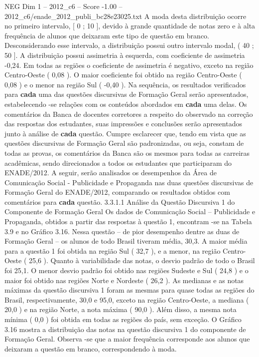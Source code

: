 \begin{textsample}{NEG Dim 1 – 2012\_c6 – Score -1.00 – 2012\_c6/enade\_2012\_publi\_bc28e23025.txt}
A moda desta distribuição ocorre no primeiro intervalo, [ 0 ; 10 ], devido à grande quantidade de notas zero e à alta frequência de alunos que deixaram este tipo de questão em branco.
Desconsiderando esse intervalo, a distribuição possui outro intervalo modal, ( 40 ; 50 ].
A distribuição possui assimetria à esquerda, com coeficiente de assimetria -0,24.
Em todas as regiões o coeficiente de assimetria é negativo, exceto na região Centro-Oeste ( 0,08 ).
O maior coeficiente foi obtido na região Centro-Oeste ( 0,08 ) e o menor na região Sul ( -0,40 ).
Na sequência, os resultados verificados para \textbf{cada} uma das questões discursivas de Formação Geral serão apresentados, estabelecendo -se relações com os conteúdos abordados em \textbf{cada} uma delas.
Os comentários da Banca de docentes corretores a respeito do observado na correção das respostas dos estudantes, suas impressões e conclusões serão apresentados junto à análise de \textbf{cada} questão.
Cumpre esclarecer que, tendo em vista que as questões discursivas de Formação Geral são padronizadas, ou seja, constam de todas as provas, os comentários da Banca são os mesmos para todas as carreiras acadêmicas, sendo direcionados a todos os estudantes que participaram do ENADE/2012.
A seguir, serão analisados os desempenhos da Área de Comunicação Social - Publicidade e Propaganda nas duas questões discursivas de Formação Geral do ENADE/2012, comparando os resultados obtidos com comentários para \textbf{cada} questão. 3.3.1.1 Análise da Questão Discursiva 1 do Componente de Formação Geral Os dados de Comunicação Social – Publicidade e Propaganda, obtidos a partir das respostas à questão 1, encontram -se na Tabela 3.9 e no Gráfico 3.16.
Nessa questão – de pior desempenho dentre as duas de Formação Geral – os alunos de todo Brasil tiveram média, 30,3.
A maior média para a questão 1 foi obtida na região Sul ( 32,7 ), e a menor, na região Centro-Oeste ( 25,6 ).
Quanto à variabilidade das notas, o desvio padrão de todo o Brasil foi 25,1.
O menor desvio padrão foi obtido nas regiões Sudeste e Sul ( 24,8 ) e o maior foi obtido nas regiões Norte e Nordeste ( 26,2 ).
As medianas e as notas máximas da questão discursiva 1 foram as mesmas para quase todas as regiões do Brasil, respectivamente, 30,0 e 95,0, exceto na região Centro-Oeste, a mediana ( 20,0 ) e na região Norte, a nota máxima ( 90,0 ).
Além disso, a mesma nota mínima ( 0,0 ) foi obtida em todas as regiões do país, sem exceção.
O Gráfico 3.16 mostra a distribuição das notas na questão discursiva 1 do componente de Formação Geral.
Observa -se que a maior frequência corresponde aos alunos que deixaram a questão em branco, correspondendo à moda.

\end{textsample}
